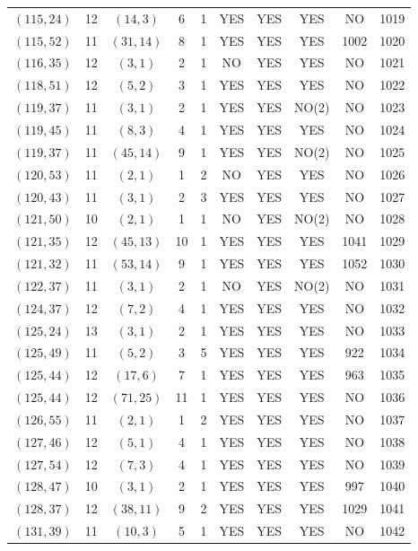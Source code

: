 \begin{longtable}{|c|c|c|c|c|c|c|c|c|c|}
$(115, 24)$ & 12 & $(14, 3)$ & 6 & 1 & YES & YES & YES & NO & 1019\\
$(115, 52)$ & 11 & $(31, 14)$ & 8 & 1 & YES & YES & YES & 1002 & 1020\\
$(116, 35)$ & 12 & $(3, 1)$ & 2 & 1 & NO & YES & YES & NO & 1021\\
$(118, 51)$ & 12 & $(5, 2)$ & 3 & 1 & YES & YES & YES & NO & 1022\\
$(119, 37)$ & 11 & $(3, 1)$ & 2 & 1 & YES & YES & NO(2) & NO & 1023\\
$(119, 45)$ & 11 & $(8, 3)$ & 4 & 1 & YES & YES & YES & NO & 1024\\
$(119, 37)$ & 11 & $(45, 14)$ & 9 & 1 & YES & YES & NO(2) & NO & 1025\\
$(120, 53)$ & 11 & $(2, 1)$ & 1 & 2 & NO & YES & YES & NO & 1026\\
$(120, 43)$ & 11 & $(3, 1)$ & 2 & 3 & YES & YES & YES & NO & 1027\\
$(121, 50)$ & 10 & $(2, 1)$ & 1 & 1 & NO & YES & NO(2) & NO & 1028\\
$(121, 35)$ & 12 & $(45, 13)$ & 10 & 1 & YES & YES & YES & 1041 & 1029\\
$(121, 32)$ & 11 & $(53, 14)$ & 9 & 1 & YES & YES & YES & 1052 & 1030\\
$(122, 37)$ & 11 & $(3, 1)$ & 2 & 1 & NO & YES & NO(2) & NO & 1031\\
$(124, 37)$ & 12 & $(7, 2)$ & 4 & 1 & YES & YES & YES & NO & 1032\\
$(125, 24)$ & 13 & $(3, 1)$ & 2 & 1 & YES & YES & YES & NO & 1033\\
$(125, 49)$ & 11 & $(5, 2)$ & 3 & 5 & YES & YES & YES & 922 & 1034\\
$(125, 44)$ & 12 & $(17, 6)$ & 7 & 1 & YES & YES & YES & 963 & 1035\\
$(125, 44)$ & 12 & $(71, 25)$ & 11 & 1 & YES & YES & YES & NO & 1036\\
$(126, 55)$ & 11 & $(2, 1)$ & 1 & 2 & YES & YES & YES & NO & 1037\\
$(127, 46)$ & 12 & $(5, 1)$ & 4 & 1 & YES & YES & YES & NO & 1038\\
$(127, 54)$ & 12 & $(7, 3)$ & 4 & 1 & YES & YES & YES & NO & 1039\\
$(128, 47)$ & 10 & $(3, 1)$ & 2 & 1 & YES & YES & YES & 997 & 1040\\
$(128, 37)$ & 12 & $(38, 11)$ & 9 & 2 & YES & YES & YES & 1029 & 1041\\
$(131, 39)$ & 11 & $(10, 3)$ & 5 & 1 & YES & YES & YES & NO & 1042\\

\end{longtable}
